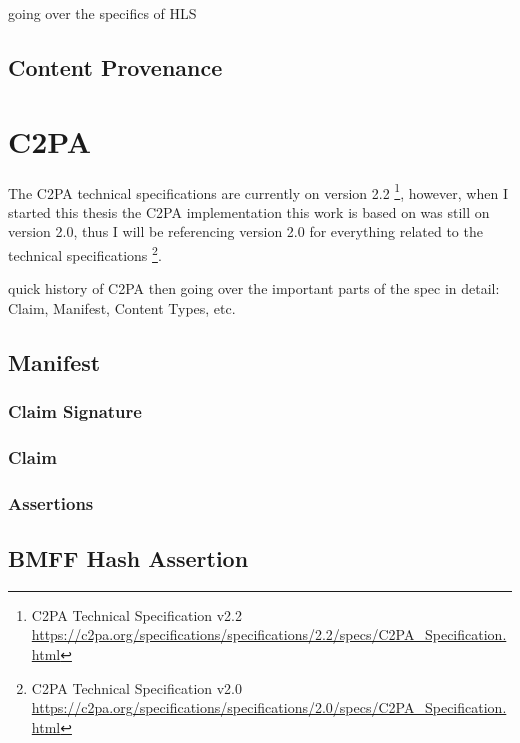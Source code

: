 going over the specifics of HLS

\subsection{Content Provenance\label{sec:conpro}}

\section{C2PA\label{c2pa}}

The C2PA technical specifications are currently on version 2.2 \footnote{C2PA Technical Specification v2.2 \url{https://c2pa.org/specifications/specifications/2.2/specs/C2PA_Specification.html}}, however, when I started this thesis the C2PA implementation this work is based on was still on version 2.0, thus I will be referencing version 2.0 for everything related to the technical specifications \footnote{C2PA Technical Specification v2.0 \url{https://c2pa.org/specifications/specifications/2.0/specs/C2PA_Specification.html}}.

quick history of C2PA then going over the important parts of the spec in detail: Claim, Manifest, Content Types, etc.

\subsection{Manifest}

\subsubsection{Claim Signature}

\subsubsection{Claim}

\subsubsection{Assertions}

\subsection{BMFF Hash Assertion}

